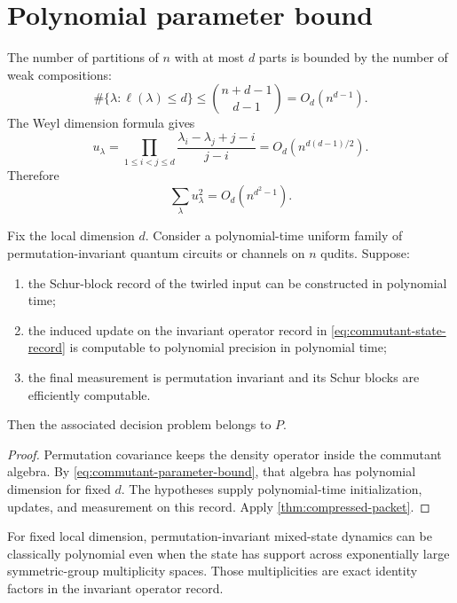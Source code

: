 \section{Polynomial parameter bound}
The number of partitions of $n$ with at most $d$ parts is bounded by the number of weak compositions:
\[
\#\{\lambda:\ell(\lambda)\le d\}
\le
\binom{n+d-1}{d-1}
=O_d(n^{d-1}).
\]
The Weyl dimension formula gives
\begin{equation}
u_\lambda
=
\prod_{1\le i<j\le d}
\frac{\lambda_i-\lambda_j+j-i}{j-i}
=O_d\left(n^{d(d-1)/2}\right).
\label{eq:weyl-dimension-bound}
\end{equation}
Therefore
\begin{equation}
\sum_\lambda u_\lambda^2
=O_d\left(n^{d^2-1}\right).
\label{eq:commutant-parameter-bound}
\end{equation}

\begin{theorem}
\label{thm:schur-commutant-collapse}
Fix the local dimension $d$. Consider a polynomial-time uniform family of permutation-invariant quantum circuits or channels on $n$ qudits. Suppose:
\begin{enumerate}
\item the Schur-block record of the twirled input can be constructed in polynomial time;
\item the induced update on the invariant operator record in \cref{eq:commutant-state-record} is computable to polynomial precision in polynomial time;
\item the final measurement is permutation invariant and its Schur blocks are efficiently computable.
\end{enumerate}
Then the associated decision problem belongs to $P$.
\end{theorem}

\begin{proof}
Permutation covariance keeps the density operator inside the commutant algebra. By \cref{eq:commutant-parameter-bound}, that algebra has polynomial dimension for fixed $d$. The hypotheses supply polynomial-time initialization, updates, and measurement on this record. Apply \cref{thm:compressed-packet}.
\end{proof}

\begin{derivedbox}
For fixed local dimension, permutation-invariant mixed-state dynamics can be classically polynomial even when the state has support across exponentially large symmetric-group multiplicity spaces. Those multiplicities are exact identity factors in the invariant operator record.
\end{derivedbox}

